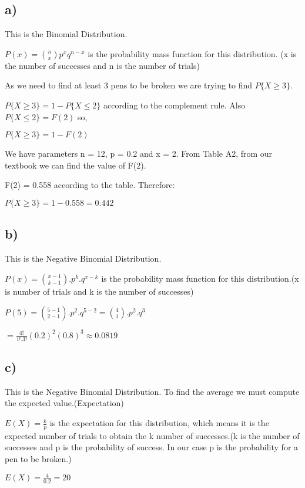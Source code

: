\documentclass[12pt]{article}
\begin{document}
\subsection*{a)}
This is the Binomial Distribution.\\ \par 
$P(x) = \binom {n}{x} p^x q^{n-x}$ is the probability mass function for this distribution. (x is the number of successes and n is the number of trials)\\ \par 
As we need to find at least 3 pens to be broken we are trying to find $P\lbrace X \geq 3 \rbrace$.\\ \par 
$P\lbrace X \geq 3 \rbrace = 1 - P\lbrace X \leq 2 \rbrace$ according to the complement rule. Also $P\lbrace X \leq 2 \rbrace = F(2)$ so,\\ \par
$P\lbrace X \geq 3 \rbrace = 1 - F(2)$\\ \par 
We have parameters n = 12, p = 0.2 and x = 2. From Table A2, from our textbook we can find the value of F(2).\\ \par 
F(2) = 0.558 according to the table. Therefore:\\ \par 
$P\lbrace X \geq 3 \rbrace = 1 - 0.558 =  0.442$
 

\subsection*{b)}
This is the Negative Binomial Distribution.\\ \par 
$P(x) = \binom {x-1}{k-1}.p^k.q^{x-k}$ is the probability mass function for this distribution.(x is number of trials and k is the number of successes)\\ \par 
$P(5) = \binom {5-1}{2-1}.p^{2}.q^{5-2} = \binom{4}{1}.p^{2}.q^{3}$\\ \par 
$= \frac{4!}{1!.3!}(0.2)^2(0.8)^3 \approx 0.0819$
\subsection*{c)}
This is the Negative Binomial Distribution. To find the average we must compute the expected value.(Expectation)\\ \par 
$E(X) = \frac{k}{p}$ is the expectation for this distribution, which means it is the expected number of trials to obtain the k number of successes.(k is the number of successes and p is the probability of success. In our case p is the probability for a pen to be broken.)\\ \par 
$E(X) = \frac{4}{0.2} = 20$
\end{document}
